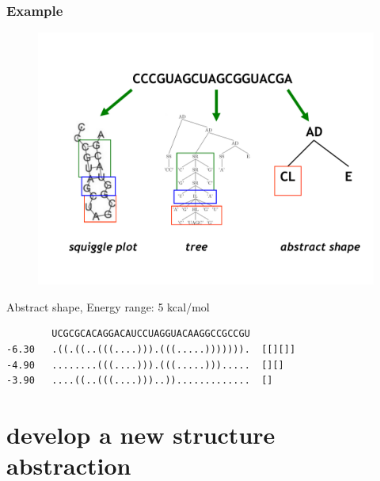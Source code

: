 \documentclass[ignorenonframetext,10pt]{beamer}
\begin{document}
\begin{frame}
\frametitle{Example }
\begin{figure}
  \includegraphics[scale=0.4]{images/shrep_example.pdf} 
\end{figure}
\end{frame}


\begin{frame}[fragile]
  \begin{block}{\small Abstract shape, Energy range: 5 kcal/mol}
  \begin{verbatim}
        UCGCGCACAGGACAUCCUAGGUACAAGGCCGCCGU
-6.30   .((.((..(((....))).(((.....))))))).  [[][]]
-4.90   ........(((....))).(((.....))).....  [][]
-3.90   ....((..(((....)))..)).............  []
  \end{verbatim}
  \end{block}
\end{frame}

\section{develop a new structure abstraction}
\end{document}
